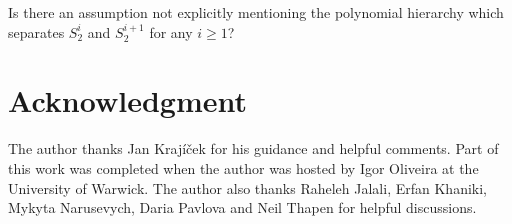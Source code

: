 \documentclass{lmcs}
\begin{document}
\begin{qu}
    Is there an assumption not explicitly mentioning the polynomial hierarchy which separates $S^i_2$ and $S^{i+1}_2$ for any $i\geq 1$?
\end{qu}

\section*{Acknowledgment}

The author thanks Jan Krajíček for his guidance and helpful comments. Part of this work was completed when the author was hosted by Igor Oliveira at the University of Warwick. The author also thanks Raheleh Jalali, Erfan Khaniki, Mykyta Narusevych, Daria Pavlova and Neil Thapen for helpful discussions.




\end{document}
